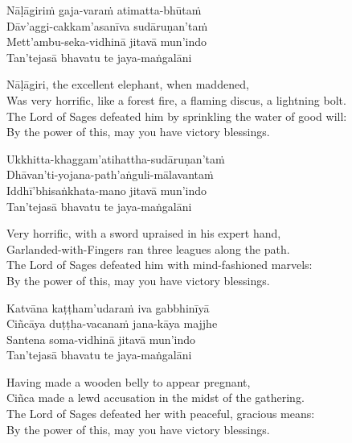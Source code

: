 \begin{pali-hang-continued}
  Nāḷāgiriṁ gaja-varaṁ atimatta-bhūtaṁ\\
  Dāv'aggi-cakkam'asanīva sudāruṇan'taṁ\\
  Mett'ambu-seka-vidhinā jitavā mun'indo\\
  Tan'tejasā bhavatu te jaya-maṅgalāni\\
\end{pali-hang-continued}

\begin{english-verses}
  Nāḷāgiri, the excellent elephant, when maddened,\\
  Was very horrific, like a forest fire, a flaming discus, a lightning bolt.\\
  The Lord of Sages defeated him by sprinkling the water of good will:\\
  By the power of this, may you have victory blessings.
\end{english-verses}

\begin{pali-hang-continued}
  Ukkhitta-khaggam'atihattha-sudāruṇan'taṁ\\
  Dhāvan'ti-yojana-path'aṅguli-mālavantaṁ\\
  Iddhī'bhisaṅkhata-mano jitavā mun'indo\\
  Tan'tejasā bhavatu te jaya-maṅgalāni
\end{pali-hang-continued}

\begin{english-verses}
  Very horrific, with a sword upraised in his expert hand,\\
  Garlanded-with-Fingers ran three leagues along the path.\\
  The Lord of Sages defeated him with mind-fashioned marvels:\\
  By the power of this, may you have victory blessings.
\end{english-verses}

\begin{pali-hang-continued}
  Katvāna kaṭṭham'udaraṁ iva gabbhinīyā\\
  Ciñcāya duṭṭha-vacanaṁ jana-kāya majjhe\\
  Santena soma-vidhinā jitavā mun'indo\\
  Tan'tejasā bhavatu te jaya-maṅgalāni
\end{pali-hang-continued}

\begin{english-verses}
  Having made a wooden belly to appear pregnant,\\
  Ciñca made a lewd accusation in the midst of the gathering.\\
  The Lord of Sages defeated her with peaceful, gracious means:\\
  By the power of this, may you have victory blessings.
\end{english-verses}

